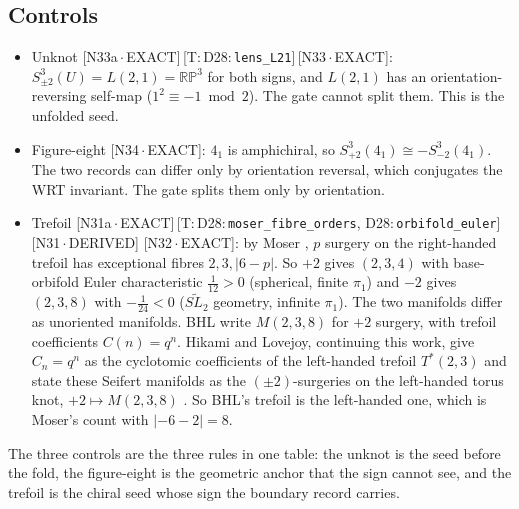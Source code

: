 \documentclass[11pt]{article}
\theoremstyle{definition}
\newcommand{\lean}[1]{\texttt{\small #1}}
\newcommand{\dtag}[1]{#1}
\begin{document}
\subsection{Controls}
\begin{itemize}[leftmargin=2em]
\item Unknot \dtag{\textsf{\small[N33a\,$\cdot$\,EXACT]}\,\textsf{\small[T:\,D28:\,\lean{lens\_\allowbreak{}L21}]}\,\textsf{\small[N33\,$\cdot$\,EXACT]}}: $S^3_{\pm2}(U)=L(2,1)=\mathbb{RP}^3$ for both signs, and $L(2,1)$ has an orientation-reversing self-map ($1^2\equiv-1\bmod2$). The gate cannot split them. This is the unfolded seed.
\item Figure-eight \dtag{\textsf{\small[N34\,$\cdot$\,EXACT]}}: $4_1$ is amphichiral, so $S^3_{+2}(4_1)\cong-S^3_{-2}(4_1)$. The two records can differ only by orientation reversal, which conjugates the WRT invariant. The gate splits them only by orientation.
\item Trefoil \dtag{\textsf{\small[N31a\,$\cdot$\,EXACT]}\,\textsf{\small[T:\,D28:\,\lean{moser\_\allowbreak{}fibre\_\allowbreak{}orders}, D28:\,\lean{orbifold\_\allowbreak{}euler}]}\,\textsf{\small[N31\,$\cdot$\,DERIVED]} \textsf{\small[N32\,$\cdot$\,EXACT]}}: by Moser \cite{Moser}, $p$ surgery on the right-handed trefoil has exceptional fibres $2,3,|6-p|$. So $+2$ gives $(2,3,4)$ with base-orbifold Euler characteristic $\tfrac1{12}>0$ (spherical, finite $\pi_1$) and $-2$ gives $(2,3,8)$ with $-\tfrac1{24}<0$ ($\widetilde{SL_2}$ geometry, infinite $\pi_1$). The two manifolds differ as unoriented manifolds. BHL write $M(2,3,8)$ for $+2$ surgery, with trefoil coefficients $C(n)=q^n$. Hikami and Lovejoy, continuing this work, give $C_n=q^{n}$ as the cyclotomic coefficients of the left-handed trefoil $T^*(2,3)$ and state these Seifert manifolds as the $(\pm2)$-surgeries on the left-handed torus knot, $+2\mapsto M(2,3,8)$ \cite{HikamiLovejoy}. So BHL's trefoil is the left-handed one, which is Moser's count with $|-6-2|=8$.
\end{itemize}
The three controls are the three rules in one table: the unknot is the seed before the fold, the figure-eight is the geometric anchor that the sign cannot see, and the trefoil is the chiral seed whose sign the boundary record carries.
\end{document}
